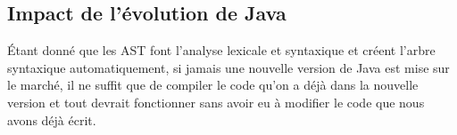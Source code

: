 \documentclass[11pt,french]{article}
\begin{document}
        \subsection{Impact de l'évolution de Java} %
        \label{sub:impact-evolution-java}
        Étant donné que les AST font l'analyse lexicale et syntaxique et créent l'arbre syntaxique automatiquement, 
        si jamais une nouvelle version de Java est mise sur le marché, il ne suffit que de compiler le code qu'on a
        déjà dans la nouvelle version et tout devrait fonctionner sans avoir eu à modifier le code que nous avons 
        déjà écrit.
\end{document}
